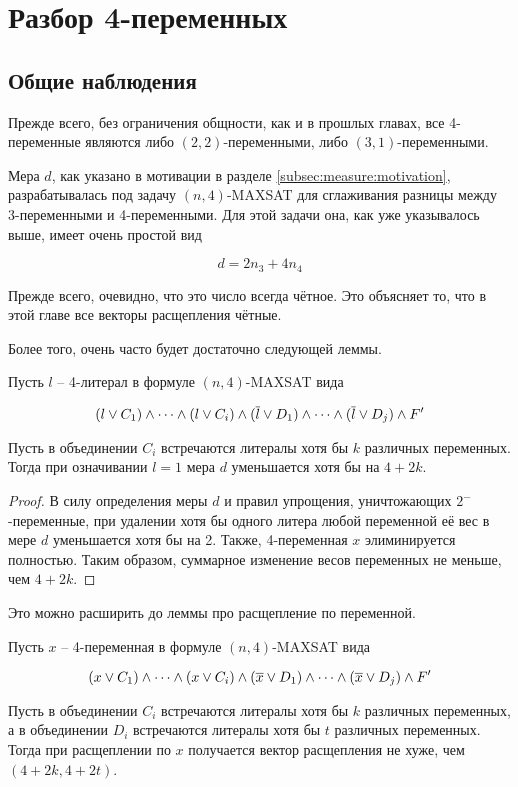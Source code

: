 
\section{Разбор 4-переменных}
\label{sec:n4}

\subsection{Общие наблюдения}
\label{subsec:n4:observations}

\firstpar{}Прежде всего, без ограничения общности, как и в прошлых главах, все 4-переменные являются либо $(2,2)$-переменными, либо $(3,1)$-переменными.

Мера $d$, как указано в мотивации в разделе \ref{subsec:measure:motivation}, разрабатывалась под задачу $(n,4)$-MAXSAT для сглаживания разницы между 3-переменными и 4-переменными. Для этой задачи она, как уже указывалось выше, имеет очень простой вид

$$
 d = 2n_3 + 4n_4
$$

Прежде всего, очевидно, что это число всегда чётное. Это объясняет то, что в этой главе все векторы расщепления чётные.

Более того, очень часто будет достаточно следующей леммы.

\begin{lemma}
 Пусть $l$ -- 4-литерал в формуле $(n,4)$-MAXSAT вида

 $$
  (l \vee C_1) \wedge \dots \wedge (l \vee C_i) \wedge (\overline{l} \vee D_1) \wedge \dots \wedge (\overline{l} \vee D_j) \wedge F'
 $$

 Пусть в объединении $C_i$ встречаются литералы хотя бы $k$ различных переменных.
 Тогда при означивании $l = 1$ мера $d$ уменьшается хотя бы на $4 + 2k$.
 \label{lemma:n4:one-side}
\end{lemma}

\begin{proof}
 В силу определения меры $d$ и правил упрощения, уничтожающих $2^-$-переменные, при удалении хотя бы одного литера любой переменной её вес в мере $d$ уменьшается хотя бы на 2. Также, 4-переменная $x$ элиминируется полностью. Таким образом, суммарное изменение весов переменных не меньше, чем $4 + 2k$.
\end{proof}

Это можно расширить до леммы про расщепление по переменной.

\begin{lemma}
 Пусть $x$ -- 4-переменная в формуле $(n,4)$-MAXSAT вида

 $$
  (x \vee C_1) \wedge \dots \wedge (x \vee C_i) \wedge (\overline{x} \vee D_1) \wedge \dots \wedge (\overline{x} \vee D_j) \wedge F'
 $$

 Пусть в объединении $C_i$ встречаются литералы хотя бы $k$ различных переменных, а в объединении $D_i$ встречаются литералы хотя бы $t$ различных переменных.
 Тогда при расщеплении по $x$ получается вектор расщепления не хуже, чем $(4 + 2k, 4 + 2t)$.
 \label{lemma:n4:branch-on}
\end{lemma}

